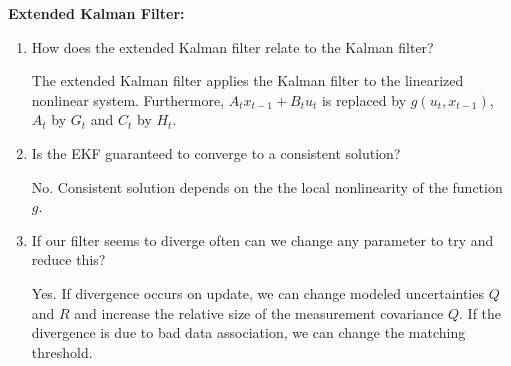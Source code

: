 \documentclass[11pt,a4paper]{article}
\begin{document}
\par \textbf{Extended Kalman Filter:}
\begin{enumerate}
	\item \addtocounter{cnt_questions}{1} How does the extended Kalman filter relate to the Kalman filter?
		\par The extended Kalman filter applies the Kalman filter to the linearized nonlinear system. Furthermore, $A_{t} x_{t-1} + B_{t} u_{t}$ is replaced by $g(u_{t}, x_{t-1})$, $A_{t}$ by $G_{t}$ and $C_{t}$ by $H_{t}$.

	\item \addtocounter{cnt_questions}{1} Is the EKF guaranteed to converge to a consistent solution?
		\par No. Consistent solution depends on the the local nonlinearity of the function $g$.

	\item \addtocounter{cnt_questions}{1} If our filter seems to diverge often can we change any parameter to try and reduce this?
		\par Yes. If divergence occurs on update, we can change modeled uncertainties $Q$ and $R$ and increase the relative size of the measurement covariance $Q$. If the divergence is due to bad data association, we can change the matching threshold.
\end{enumerate}
\end{document}
